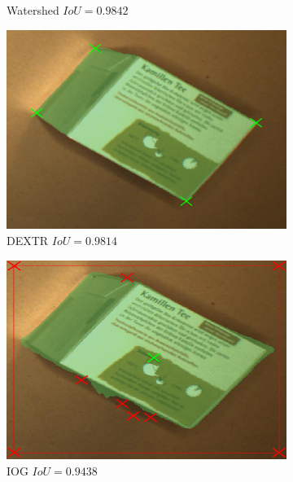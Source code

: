 \begin{figure}
\begin{subfigure}[t]{0.3\textwidth}
		\caption{
			Watershed $ IoU = 0.9842 $
		}
	\end{subfigure}
	\hfill
	\begin{subfigure}[t]{0.3\textwidth}
		\centering
		\includegraphics[width=\textwidth]{figures/appendix/method_predictions/tea17_dextr.png}
		\caption{
			DEXTR $ IoU = 0.9814 $
		}
	\end{subfigure}
	\hfill
	\begin{subfigure}[t]{0.3\textwidth}
		\centering
		\includegraphics[width=\textwidth]{figures/appendix/method_predictions/tea17_iog.png}
		\caption{
			IOG $ IoU = 0.9438 $
		}
	\end{subfigure}
	\\
	\begin{subfigure}[t]{0.3\textwidth}
		\centering

\end{subfigure}
\end{figure}
